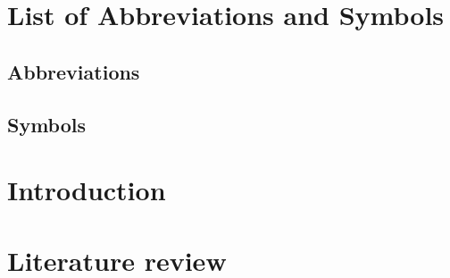 \documentclass[a4paper,master=mai,masteroption=ecs,english]{kulemt}
\begin{document}
\begin{preface}

\end{preface}
\tableofcontents*
\begin{abstract}

\end{abstract}
\listoffiguresandtables
\chapter{List of Abbreviations and Symbols}
\section*{Abbreviations}

\section*{Symbols}
\mainmatter
\chapter{Introduction}

\chapter{Literature review}

\appendixpage*
\appendix

% 
\backmatter


\end{document}
